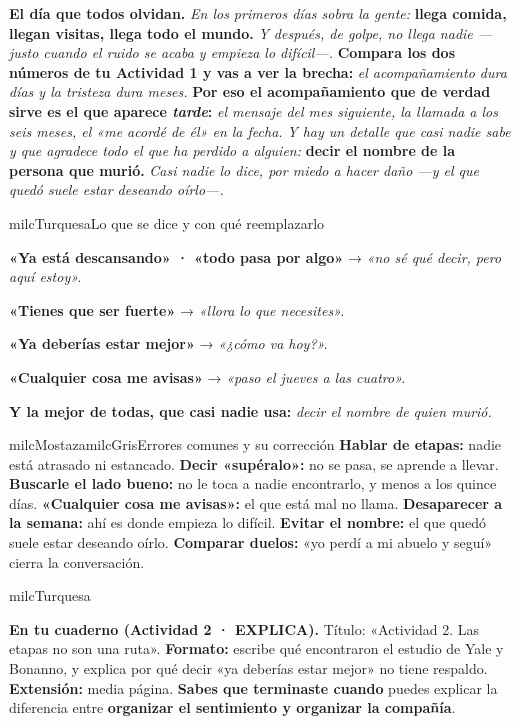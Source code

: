 \documentclass[11pt,letterpaper]{article}
\newcommand{\milcpaso}[3]{%
\Needspace{4\baselineskip}%
\begin{tcolorbox}[enhanced,colback=white,colframe=milcLinea,arc=1.5mm,boxrule=.9pt,
  left=14mm,right=4mm,top=3mm,bottom=3mm,before skip=4pt,after skip=4pt,
  fontupper=\RaggedRight,
  overlay={\node[anchor=north west,circle,fill=#2,text=white,inner sep=0pt,
    minimum size=7.4mm,font=\sffamily\bfseries\small]
    at ([xshift=3.6mm,yshift=-3.2mm]frame.north west) {#1};}]
#3
\end{tcolorbox}}
\begin{document}
\milcpaso{4}{milcTurquesa}{\textbf{El día que todos olvidan.} \emph{En los primeros días sobra la gente:} \textbf{llega comida, llegan visitas, llega todo el mundo.} \emph{Y después, de golpe, no llega nadie ---justo cuando el ruido se acaba y empieza lo difícil---.} \textbf{Compara los dos números de tu Actividad 1 y vas a ver la brecha:} \emph{el acompañamiento dura días y la tristeza dura meses.} \textbf{Por eso el acompañamiento que de verdad sirve es el que aparece \emph{tarde}:} \emph{el mensaje del mes siguiente, la llamada a los seis meses, el «me acordé de él» en la fecha.} \emph{Y hay un detalle que casi nadie sabe y que agradece todo el que ha perdido a alguien:} \textbf{decir el nombre de la persona que murió.} \emph{Casi nadie lo dice, por miedo a hacer daño ---y el que quedó suele estar deseando oírlo---.}}

\begin{drawbox}{milcTurquesa}{Lo que se dice y con qué reemplazarlo}
\begin{pasoslista}
\item \textbf{«Ya está descansando» · «todo pasa por algo»} → \emph{«no sé qué decir, pero aquí estoy».}
\item \textbf{«Tienes que ser fuerte»} → \emph{«llora lo que necesites».}
\item \textbf{«Ya deberías estar mejor»} → \emph{«¿cómo va hoy?».}
\item \textbf{«Cualquier cosa me avisas»} → \emph{«paso el jueves a las cuatro».}
\item \textbf{Y la mejor de todas, que casi nadie usa:} \emph{decir el nombre de quien murió.}
\end{pasoslista}
\end{drawbox}

\begin{softbox}{milcMostaza}{milcGris}{Errores comunes y su corrección}
\textbf{Hablar de etapas:} nadie está atrasado ni estancado. \textbf{Decir «supéralo»:} no se pasa, se aprende a llevar. \textbf{Buscarle el lado bueno:} no le toca a nadie encontrarlo, y menos a los quince días. \textbf{«Cualquier cosa me avisas»:} el que está mal no llama. \textbf{Desaparecer a la semana:} ahí es donde empieza lo difícil. \textbf{Evitar el nombre:} el que quedó suele estar deseando oírlo. \textbf{Comparar duelos:} «yo perdí a mi abuelo y seguí» cierra la conversación.
\end{softbox}

\begin{infoband}{milcTurquesa}


\textbf{En tu cuaderno (Actividad 2 · EXPLICA).} Título: «Actividad 2. Las etapas no son una ruta». \textbf{Formato:} escribe qué encontraron el estudio de Yale y Bonanno, y explica por qué decir «ya deberías estar mejor» no tiene respaldo. \textbf{Extensión:} media página. \textbf{Sabes que terminaste cuando} puedes explicar la diferencia entre \textbf{organizar el sentimiento y organizar la compañía}.
\end{infoband}
\end{document}
